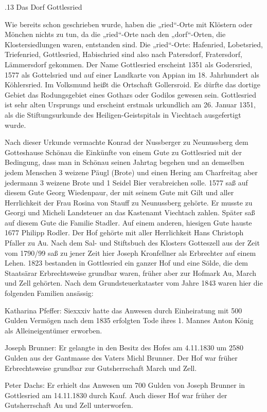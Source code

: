 \documentclass{book}
\begin{document}
.13 Das Dorf Gottlesried

Wie bereits schon geschrieben wurde, haben die „ried“-Orte mit Klöstern oder
Mönchen nichts zu tun, da die „ried“-Orte nach den „dorf“-Orten, die
Klostersiedlungen waren, entstanden sind. Die „ried“-Orte: Hafenried,
Lobetsried, Triefenried, Gottlesried, Habischried sind also nach Patersdorf,
Fratersdorf, Lämmersdorf gekommen. Der Name Gottlesried erscheint 1351 als
Godersried, 1577 als Gottelsried und auf einer Landkarte von Appian im 18.
Jahrhundert als Köhlersried. Im Volksmund heißt die Ortschaft Gollersroid. Es
dürfte das dortige Gebiet das Rodungsgebiet eines Gothars oder Godilos gewesen
sein. Gottlesried ist sehr alten Ursprungs und erscheint erstmals urkundlich am
26. Januar 1351, als die Stiftungsurkunde des Heiligen-Geistspitals in Viechtach
ausgefertigt wurde.

Nach dieser Urkunde vermachte Konrad der Nussberger zu Neunussberg dem
Gotteshause Schönau die Einkünfte von einem Gute zu Gottlesried mit der
Bedingung, dass man in Schönau seinen Jahrtag begehen und an demselben jedem
Menschen 3 weizene Päugl (Brote) und einen Hering am Charfreitag aber jedermann
3 weizene Brote und 1 Seidel Bier verabreichen solle. 1577 saß auf diesem Gute
Georg Wiedenpaur, der mit seinem Gute mit Gilt und aller Herrlichkeit der Frau
Rosina von Stauff zu Neunussberg gehörte. Er musste zu Georgi und Micheli
Landsteuer an das Kastenamt Viechtach zahlen. Später saß auf diesem Gute die
Familie Stadler. Auf einem anderen, hiesigen Gute hauste 1677 Philipp Rodler.
Der Hof gehörte mit aller Herrlichkeit Hans Christoph Pfaller zu Au. Nach dem
Sal- und Stiftsbuch des Klosters Gotteszell aus der Zeit vom 1790/99 saß zu
jener Zeit hier Joseph Kronfellner als Erbrechter auf einem Lehen. 1823
bestanden in Gottlesried ein ganzer Hof und eine Sölde, die dem Staatsärar
Erbrechtsweise grundbar waren, früher aber zur Hofmark Au, March und Zell
gehörten. Nach dem Grundsteuerkataster vom Jahre 1843 waren hier die folgenden
Familien ansässig:



Katharina Pfeffer: Siexxxiv hatte das Anwesen durch Einheiratung mit 500 Gulden
Vermögen nach dem 1835 erfolgten Tode ihres 1. Mannes Anton König als
Alleineigentümer erworben.

Joseph Brunner: Er gelangte in den Besitz des Hofes am 4.11.1830 um 2580 Gulden
aus der Gantmasse des Vaters Michl Brunner. Der Hof war früher Erbrechtsweise
grundbar zur Gutsherrschaft March und Zell.

Peter Dachs: Er erhielt das Anwesen um 700 Gulden von Joseph Brunner in
Gottlesried am 14.11.1830 durch Kauf. Auch dieser Hof war früher der
Gutsherrschaft Au und Zell unterworfen.
\end{document}
